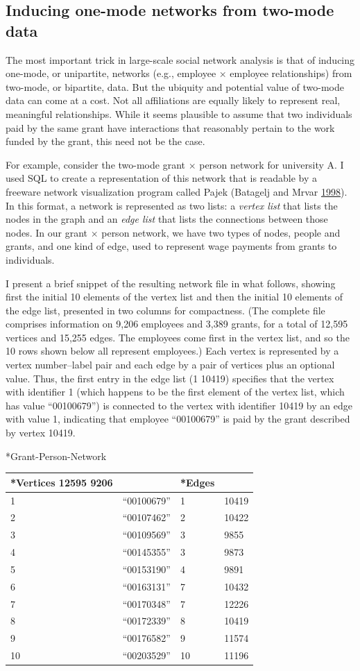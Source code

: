 \documentclass[]{krantz}
\begin{document}
\subsection{Inducing one-mode networks from two-mode
data}\label{inducing-one-mode-networks-from-two-mode-data}

The most important trick in large-scale social network analysis is that
of inducing one-mode, or unipartite, networks (e.g., employee \(\times\)
employee relationships) from two-mode, or bipartite, data. But the
ubiquity and potential value of two-mode data can come at a cost. Not
all affiliations are equally likely to represent real, meaningful
relationships. While it seems plausible to assume that two individuals
paid by the same grant have interactions that reasonably pertain to the
work funded by the grant, this need not be the case.

For example, consider the two-mode grant \(\times\) person network for
university A. I used SQL to create a representation of this network that
is readable by a freeware network visualization program called Pajek
(Batagelj and Mrvar \protect\hyperlink{ref-batagelj1998pajek}{1998}). In
this format, a network is represented as two lists: a \emph{vertex list}
that lists the nodes in the graph and an \emph{edge list} that lists the
connections between those nodes. In our grant \(\times\) person network,
we have two types of nodes, people and grants, and one kind of edge,
used to represent wage payments from grants to individuals.

I present a brief snippet of the resulting network file in what follows,
showing first the initial 10 elements of the vertex list and then the
initial 10 elements of the edge list, presented in two columns for
compactness. (The complete file comprises information on 9,206 employees
and 3,389 grants, for a total of 12,595 vertices and 15,255 edges. The
employees come first in the vertex list, and so the 10 rows shown below
all represent employees.) Each vertex is represented by a vertex
number--label pair and each edge by a pair of vertices plus an optional
value. Thus, the first entry in the edge list (1 10419) specifies that
the vertex with identifier 1 (which happens to be the first element of
the vertex list, which has value ``00100679'') is connected to the
vertex with identifier 10419 by an edge with value 1, indicating that
employee ``00100679'' is paid by the grant described by vertex 10419.

*Grant-Person-Network

\begin{longtable}[]{@{}llll@{}}
\toprule
*Vertices 12595 9206 & & *Edges &\tabularnewline
\midrule
\endhead
1 & ``00100679'' & 1 & 10419\tabularnewline
2 & ``00107462'' & 2 & 10422\tabularnewline
3 & ``00109569'' & 3 & 9855\tabularnewline
4 & ``00145355'' & 3 & 9873\tabularnewline
5 & ``00153190'' & 4 & 9891\tabularnewline
6 & ``00163131'' & 7 & 10432\tabularnewline
7 & ``00170348'' & 7 & 12226\tabularnewline
8 & ``00172339'' & 8 & 10419\tabularnewline
9 & ``00176582'' & 9 & 11574\tabularnewline
10 & ``00203529'' & 10 & 11196\tabularnewline
\bottomrule
\end{longtable}
\end{document}
